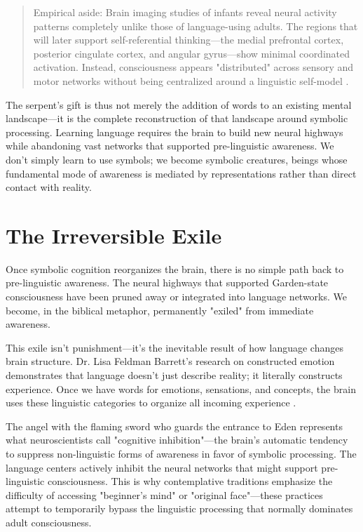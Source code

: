 \begin{quote}\small
Empirical aside: Brain imaging studies of infants reveal neural activity patterns completely unlike those of language-using adults. The regions that will later support self-referential thinking—the medial prefrontal cortex, posterior cingulate cortex, and angular gyrus—show minimal coordinated activation. Instead, consciousness appears "distributed" across sensory and motor networks without being centralized around a linguistic self-model \parencite{gao2009evidence,buckner2008brain}.
\end{quote}

The serpent's gift is thus not merely the addition of words to an existing mental landscape—it is the complete reconstruction of that landscape around symbolic processing. Learning language requires the brain to build new neural highways while abandoning vast networks that supported pre-linguistic awareness. We don't simply learn to use symbols; we become symbolic creatures, beings whose fundamental mode of awareness is mediated by representations rather than direct contact with reality.

\section{The Irreversible Exile}

Once symbolic cognition reorganizes the brain, there is no simple path back to pre-linguistic awareness. The neural highways that supported Garden-state consciousness have been pruned away or integrated into language networks. We become, in the biblical metaphor, permanently "exiled" from immediate awareness.

This exile isn't punishment—it's the inevitable result of how language changes brain structure. Dr. Lisa Feldman Barrett's research on constructed emotion demonstrates that language doesn't just describe reality; it literally constructs experience. Once we have words for emotions, sensations, and concepts, the brain uses these linguistic categories to organize all incoming experience \parencite{barrett2017constructed}.

The angel with the flaming sword who guards the entrance to Eden represents what neuroscientists call "cognitive inhibition"—the brain's automatic tendency to suppress non-linguistic forms of awareness in favor of symbolic processing. The language centers actively inhibit the neural networks that might support pre-linguistic consciousness. This is why contemplative traditions emphasize the difficulty of accessing "beginner's mind" or "original face"—these practices attempt to temporarily bypass the linguistic processing that normally dominates adult consciousness.

